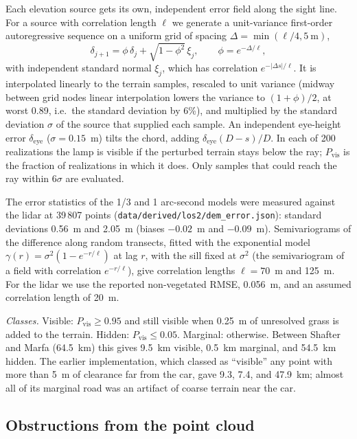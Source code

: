 \documentclass[11pt]{article}
\begin{document}
Each elevation source gets its own, independent error field along the sight line. For a source with correlation length $\ell$ we generate a unit-variance first-order autoregressive sequence on a uniform grid of spacing $\Delta=\min(\ell/4,5~\mathrm m)$,
\begin{equation}
\delta_{j+1}=\phi\,\delta_j+\sqrt{1-\phi^2}\,\xi_j,\qquad \phi=e^{-\Delta/\ell},
\end{equation}
with independent standard normal $\xi_j$, which has correlation $e^{-|\Delta s|/\ell}$. It is interpolated linearly to the terrain samples, rescaled to unit variance (midway between grid nodes linear interpolation lowers the variance to $(1+\phi)/2$, at worst 0.89, i.e.\ the standard deviation by 6\%), and multiplied by the standard deviation $\sigma$ of the source that supplied each sample. An independent eye-height error $\delta_{\mathrm{eye}}$ ($\sigma=0.15$~m) tilts the chord, adding $\delta_{\mathrm{eye}}(D-s)/D$. In each of 200 realizations the lamp is visible if the perturbed terrain stays below the ray; $P_{\mathrm{vis}}$ is the fraction of realizations in which it does. Only samples that could reach the ray within $6\sigma$ are evaluated.

The error statistics of the 1/3 and 1 arc-second models were measured against the lidar at 39\,807 points (\texttt{data/derived/los2/dem\_error.json}): standard deviations 0.56~m and 2.05~m (biases $-0.02$~m and $-0.09$~m). Semivariograms of the difference along random transects, fitted with the exponential model $\gamma(r)=\sigma^2(1-e^{-r/\ell})$ at lag $r$, with the sill fixed at $\sigma^2$ (the semivariogram of a field with correlation $e^{-r/\ell}$), give correlation lengths $\ell=70$~m and 125~m. For the lidar we use the reported non-vegetated RMSE, 0.056~m, and an assumed correlation length of 20~m.

\textit{Classes.} Visible: $P_{\mathrm{vis}}\ge0.95$ and still visible when 0.25~m of unresolved grass is added to the terrain. Hidden: $P_{\mathrm{vis}}\le0.05$. Marginal: otherwise. Between Shafter and Marfa (64.5~km) this gives 9.5~km visible, 0.5~km marginal, and 54.5~km hidden. The earlier implementation, which classed as ``visible'' any point with more than 5~m of clearance far from the car, gave 9.3, 7.4, and 47.9~km; almost all of its marginal road was an artifact of coarse terrain near the car.

\subsection{Obstructions from the point cloud}
\end{document}
